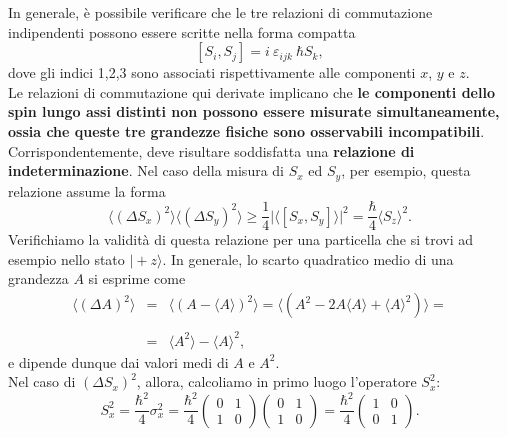 \documentclass[a4paper,12pt,oneside]{book}
\begin{document}
In generale, è possibile verificare che le tre relazioni di commutazione indipendenti possono essere scritte nella forma compatta
\begin{equation}
\left[ S_i , S_j\right] = i\ \varepsilon_{ijk}\ \hbar S_k,
\end{equation}
dove gli indici 1,2,3 sono associati rispettivamente alle componenti $x$, $y$ e $z$.\\
Le relazioni di commutazione qui derivate implicano che \textbf{le componenti dello spin lungo assi distinti non possono essere misurate simultaneamente, ossia che queste tre grandezze fisiche sono osservabili incompatibili}. Corrispondentemente, deve risultare soddisfatta una \textbf{relazione di indeterminazione}. Nel caso della misura di $S_x$ ed $S_y$, per esempio, questa relazione assume la forma
\begin{equation}
\label{eq:cap4_6}
\langle (\Delta S_x) ^2 \rangle \langle (\Delta S_y) ^2 \rangle \geq \frac{1}{4} \vert \langle \left[ S_x , S_y \right] \rangle \vert ^2 = \frac{\hbar}{4} \langle S_z \rangle ^2 .
\end{equation}
Verifichiamo la validità di questa relazione per una particella che si trovi ad esempio nello stato $\vert +z\rangle$. In generale, lo scarto quadratico medio di una grandezza $A$ si esprime come
\begin{eqnarray}
\langle (\Delta A ) ^2 \rangle & = & \langle (A- \langle A \rangle ) ^2 \rangle = \langle (A^2-2A\langle A \rangle + \langle A \rangle ^2) \rangle = \nonumber \\
\\
& = & \langle A^2\rangle - \langle A \rangle ^2, \nonumber
\end{eqnarray}
e dipende dunque dai valori medi di $A$ e $A^2$.\\
Nel caso di $(\Delta S_x) ^2$, allora, calcoliamo in primo luogo l'operatore $S_x ^2$:
\begin{equation}
S_x ^2 = \frac{\hbar ^2}{4} \sigma _x ^2=\frac{\hbar ^2}{4} \begin{pmatrix}
0 & 1 \\
1 & 0
\end{pmatrix} \begin{pmatrix}
0 & 1 \\
1 & 0
\end{pmatrix} = \frac{\hbar ^2}{4}\begin{pmatrix}
1 & 0 \\
0 & 1
\end{pmatrix}.
\end{equation}
\end{document}
